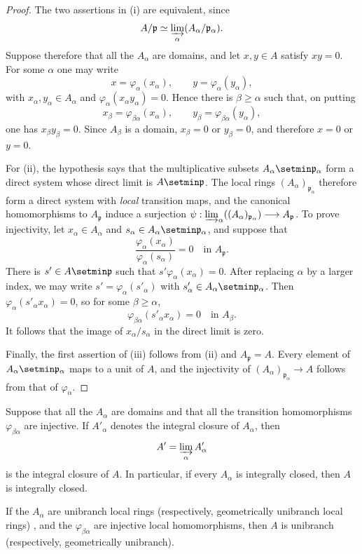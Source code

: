 \begin{proof}
The two assertions in {\rm(i)} are equivalent, since
\[
  A/\mathfrak p
  \simeq
  \varinjlim_\alpha(A_\alpha/\mathfrak p_\alpha).
\]
Suppose therefore that all the $A_\alpha$ are domains, and let
$x,y\in A$ satisfy $xy=0$.  For some $\alpha$ one may write
\[
  x=\varphi_\alpha(x_\alpha),
  \qquad
  y=\varphi_\alpha(y_\alpha),
\]
with $x_\alpha,y_\alpha\in A_\alpha$ and
$\varphi_\alpha(x_\alpha y_\alpha)=0$.  Hence there is
$\beta\geq\alpha$ such that, on putting
\[
  x_\beta=\varphi_{\beta\alpha}(x_\alpha),
  \qquad
  y_\beta=\varphi_{\beta\alpha}(y_\alpha),
\]
one has $x_\beta y_\beta=0$.  Since $A_\beta$ is a domain,
$x_\beta=0$ or $y_\beta=0$, and therefore $x=0$ or $y=0$.

For {\rm(ii)}, the hypothesis says that the multiplicative
subsets $A_\alpha\setmin\mathfrak p_\alpha$ form a direct system whose
direct limit is $A\setmin\mathfrak p$.  The local rings
$(A_\alpha)_{\mathfrak p_\alpha}$ therefore form a direct system
with \emph{local} transition maps, and the canonical homomorphisms to
$A_{\mathfrak p}$ induce a surjection $\psi:
\varinjlim_\alpha((A_\alpha)_{\mathfrak p_\alpha})
\longrightarrow A_{\mathfrak p}$.
To prove injectivity, let $x_\alpha\in A_\alpha$ and
$s_\alpha\in A_\alpha\setmin\mathfrak p_\alpha$, and suppose that
\[
  \frac{\varphi_\alpha(x_\alpha)}
       {\varphi_\alpha(s_\alpha)}
  =0
  \quad\text{in }A_{\mathfrak p}.
\]
There is $s'\in A\setmin\mathfrak p$ such that
$s'\varphi_\alpha(x_\alpha)=0$.  After replacing $\alpha$ by a
larger index, we may write
$s'=\varphi_\alpha(s'_\alpha)$ with
$s'_\alpha\in A_\alpha\setmin\mathfrak p_\alpha$.  Then
$\varphi_\alpha(s'_\alpha x_\alpha)=0$, so for some
$\beta\geq\alpha$,
\[
  \varphi_{\beta\alpha}(s'_\alpha x_\alpha)=0
  \quad\text{in }A_\beta.
\]
It follows that the image of $x_\alpha/s_\alpha$ in the direct
limit is zero.

Finally, the first assertion of {\rm(iii)} follows from {\rm(ii)}
and $A_{\mathfrak p}=A$.  Every element of
$A_\alpha\setmin\mathfrak p_\alpha$ maps to a unit of $A$, and the
injectivity of
$(A_\alpha)_{\mathfrak p_\alpha}\to A$ follows from that of
$\varphi_\alpha$.
\end{proof}

\begin{corollary}[5.13.4]
\label{IV.5.13.4}
Suppose that all the $A_\alpha$ are domains and that all the
transition homomorphisms $\varphi_{\beta\alpha}$ are injective.
If $A'_\alpha$ denotes the integral closure of $A_\alpha$, then
\[
  A'=\varinjlim_\alpha A'_\alpha
\]
is the integral closure of $A$.  In particular, if every
$A_\alpha$ is integrally closed, then $A$ is integrally closed.

If the $A_\alpha$ are unibranch local rings
\textup{(respectively,} geometrically unibranch local rings)
, and the $\varphi_{\beta\alpha}$ are injective
local homomorphisms, then $A$ is unibranch
\textup{(respectively,} geometrically unibranch).
\end{corollary}

